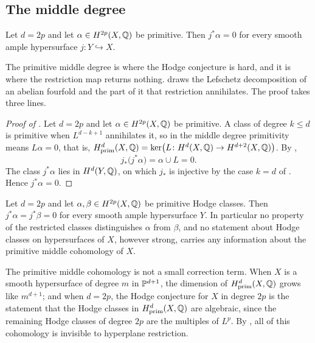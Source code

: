 \subsection{The middle degree}

\begin{theorem}\label{thm:hyperplane}
Let $d=2p$ and let $\alpha\in H^{2p}(X,\mathbb{Q})$ be primitive. Then
$j^{*}\alpha=0$ for every smooth ample hypersurface $j\colon Y\hookrightarrow X$.
\end{theorem}

The primitive middle degree is where the Hodge conjecture is hard, and it is
where the restriction map returns nothing.  draws the
Lefschetz decomposition of an abelian fourfold and the part of it that
restriction annihilates. The proof takes three lines.

\begin{proof}[Proof of ]
Let $d=2p$ and let $\alpha\in H^{2p}(X,\mathbb{Q})$ be primitive. A class of degree
$k\le d$ is primitive when $L^{d-k+1}$ annihilates it, so in the middle degree
primitivity means $L\alpha=0$, that is,
$H^{d}_{\mathrm{prim}}(X,\mathbb{Q})=\ker\bigl(L\colon H^{d}(X,\mathbb{Q})\to H^{d+2}(X,\mathbb{Q})\bigr)$.
By ,
\[
  j_{*}\bigl(j^{*}\alpha\bigr)=\alpha\cup L=0 .
\]
The class $j^{*}\alpha$ lies in $H^{d}(Y,\mathbb{Q})$, on which $j_{*}$ is injective
by the case $k=d$ of . Hence $j^{*}\alpha=0$.
\end{proof}

\begin{corollary}\label{cor:blind}
Let $d=2p$ and let $\alpha,\beta\in H^{2p}(X,\mathbb{Q})$ be primitive Hodge classes.
Then $j^{*}\alpha=j^{*}\beta=0$ for every smooth ample hypersurface $Y$. In
particular no property of the restricted classes distinguishes $\alpha$ from
$\beta$, and no statement about Hodge classes on hypersurfaces of $X$, however
strong, carries any information about the primitive middle cohomology of $X$.
\end{corollary}

\begin{remark}\label{rem:sizeofloss}
The primitive middle cohomology is not a small correction term. When $X$ is
a smooth hypersurface of degree $m$ in $\mathbb{P}^{d+1}$, the dimension of
$H^{d}_{\mathrm{prim}}(X,\mathbb{Q})$ grows like $m^{d+1}$; and when $d=2p$, the
Hodge conjecture for $X$ in degree $2p$ is the statement that the Hodge
classes in $H^{d}_{\mathrm{prim}}(X,\mathbb{Q})$ are algebraic, since the remaining
Hodge classes of degree $2p$ are the multiples of $L^{p}$. By
, all of this cohomology is invisible to hyperplane
restriction.
\end{remark}

